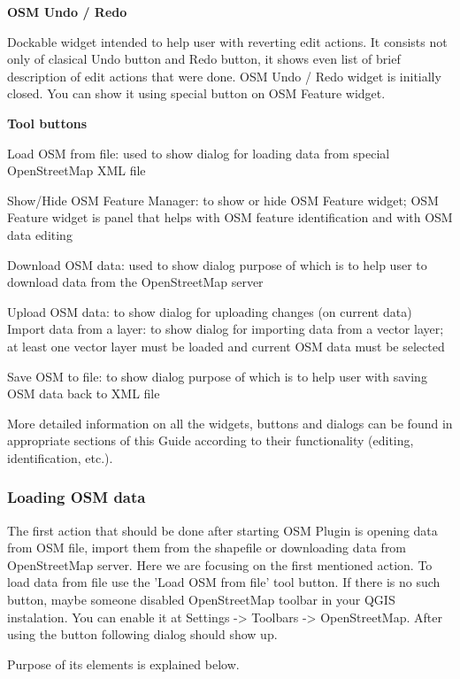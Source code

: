 \textbf{OSM Undo / Redo}

Dockable widget intended to help user with reverting edit actions. It
consists not only of clasical Undo button and Redo button, it shows even list
of brief description of edit actions that were done. OSM Undo / Redo widget
is initially closed. You can show it using special button on OSM Feature
widget.

\textbf{Tool buttons}

\begin{description}
\item Load OSM from file: used to show dialog for loading data from special
OpenStreetMap XML file
\item Show/Hide OSM Feature Manager: to show or hide OSM Feature widget; OSM
Feature widget is panel that helps with OSM feature identification and with
OSM data editing
\item Download OSM data: used to show dialog purpose of which is to help user
to download data from the OpenStreetMap server
\item Upload OSM data: to show dialog for uploading changes (on current data) 
Import data from a layer: to show dialog for importing data from a vector
layer; at least one vector layer must be loaded and current OSM data must be
selected
\item Save OSM to file: to show dialog purpose of which is to help user with
saving OSM data back to XML file
\end{description}

More detailed information on all the widgets, buttons and dialogs can be
found in appropriate sections of this Guide according to their functionality
(editing, identification, etc.).

\subsubsection{Loading OSM data}

The first action that should be done after starting OSM Plugin is opening
data from OSM file, import them from the shapefile or downloading data from
OpenStreetMap server. Here we are focusing on the first mentioned action.
To load data from file use the 'Load OSM from file' tool button. If there
is no such button, maybe someone disabled OpenStreetMap toolbar in your QGIS
instalation. You can enable it at Settings -> Toolbars -> OpenStreetMap.
After using the button following dialog should show up.

Purpose of its elements is explained below.

